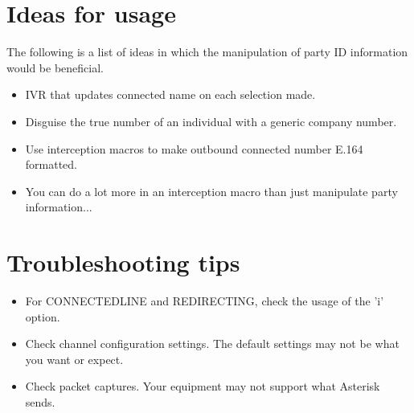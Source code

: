\section{Ideas for usage}

The following is a list of ideas in which the manipulation of party ID
information would be beneficial.

\begin{itemize}

\item IVR that updates connected name on each selection made.

\item Disguise the true number of an individual with a generic company
number.

\item Use interception macros to make outbound connected number E.164
formatted.

\item You can do a lot more in an interception macro than just manipulate
party information...

\end{itemize}

\section{Troubleshooting tips}
\begin{itemize}

\item For CONNECTEDLINE and REDIRECTING, check the usage of the 'i'
option.

\item Check channel configuration settings.  The default settings may not
be what you want or expect.

\item Check packet captures.  Your equipment may not support what Asterisk
sends.

\end{itemize}

